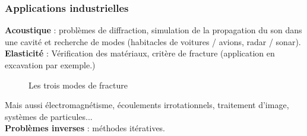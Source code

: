 \documentclass[11pt]{beamer}
\begin{document}
	\begin{frame}
		\frametitle{Applications industrielles}
		
		\textbf{Acoustique} : problèmes de diffraction, simulation de la propagation du son dans une cavité et recherche de modes (habitacles de voitures / avions, radar / sonar). \\
		\textbf{Elasticité} : Vérification des matériaux, critère de fracture (application en excavation par exemple.)
		\begin{figure}
			\centering
			\caption{Les trois modes de fracture}
		\end{figure}
		Mais aussi électromagnétisme, écoulements irrotationnels, traitement d'image, systèmes de particules...\\
		\textbf{Problèmes inverses} : méthodes itératives. 		
	\end{frame}
	
\end{document}
